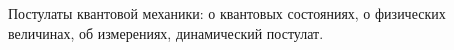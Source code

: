 \documentclass[__main__.tex]{subfiles}
\begin{document}
Постулаты квантовой механики: о квантовых состояниях, о физических величинах, об измерениях, динамический постулат.\\ 

\end{document}
